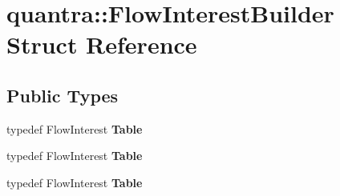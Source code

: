\hypertarget{structquantra_1_1FlowInterestBuilder}{}\section{quantra\+:\+:Flow\+Interest\+Builder Struct Reference}
\label{structquantra_1_1FlowInterestBuilder}
\subsection*{Public Types}
\begin{DoxyCompactItemize}
\item 
\mbox{\label{structquantra_1_1FlowInterestBuilder_a14f7319d7c49222183871330e89b060c}} 
typedef Flow\+Interest {\bfseries Table}
\item 
\mbox{\label{structquantra_1_1FlowInterestBuilder_a14f7319d7c49222183871330e89b060c}} 
typedef Flow\+Interest {\bfseries Table}
\item 
\mbox{\label{structquantra_1_1FlowInterestBuilder_a14f7319d7c49222183871330e89b060c}} 
typedef Flow\+Interest {\bfseries Table}
\end{DoxyCompactItemize}
